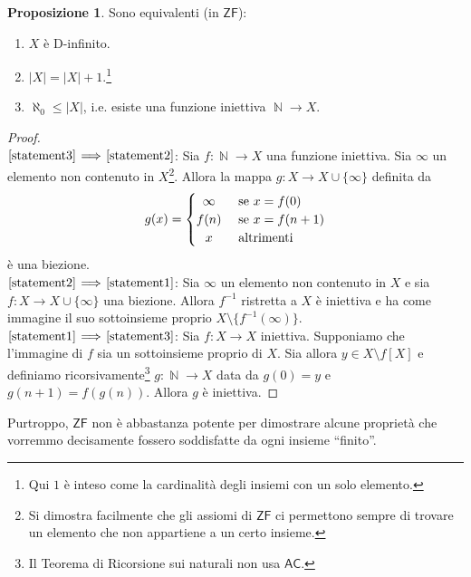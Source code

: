 \documentclass[12pt,a4paper]{report}
\theoremstyle{definition}
\newtheorem{prop}[teo]{Proposizione}  %
\theoremstyle{num.custom-title}
\DeclareMathOperator{\N}{\mathbb{N}}
\DeclareMathOperator{\sm}{\setminus}
\newcommand{\AC}{\ensuremath{\mathsf{AC}}\xspace}
\newcommand{\ZF}{\ensuremath{\mathsf{ZF}}\xspace}
\newcommand{\Implies}[2]{$\text{\ref{statement#1}}\!\implies\!\text{\ref{statement#2}}$}%
\newcommand{\punto}[1]{\item \label{statement#1}}
\newenvironment{equivalence}
    {\begin{enumerate}[label=(\arabic*),ref=(\arabic*)]
    }
    { 
	\end{enumerate}
    }
\begin{document}
\begin{prop}\label{caratt_d-fin} Sono equivalenti (in \ZF):
\begin{equivalence}
\punto{1} $X$ è D-infinito.
\punto{2} $|X|=|X|+1$.\footnote{Qui $1$ è inteso come la cardinalità degli insiemi con un solo elemento.}
\punto{3} $\aleph_0 \leq |X|$, i.e. esiste una funzione iniettiva $\N \to X$.
\end{equivalence}
\begin{proof}\ \\
\Implies{3}{2}: Sia $f: \N \to X$ una funzione iniettiva. Sia $\infty$ un elemento non contenuto in $X$\footnote{Si dimostra facilmente che gli assiomi di \ZF ci permettono sempre di trovare un elemento che non appartiene a un certo insieme.}. Allora la mappa $g: X \to X \cup \{\infty\}$ definita da 
\[
g(x)=
  \begin{cases} 
      \hfill		\infty	\hfill & \text{ se $x=f(0)$} \\
      \hfill 	f(n)		\hfill & \text{ se $x=f(n+1)$} \\
      \hfill 	x		\hfill & \text{ altrimenti} \\
  \end{cases}
\]
è una biezione.\\
\Implies{2}{1}: Sia $\infty$ un elemento non contenuto in $X$ e sia $f: X \to X \cup \{\infty\}$ una biezione. Allora $f^{-1}$ ristretta a $X$ è iniettiva e ha come immagine il suo sottoinsieme proprio $X \sm \{f^{-1}(\infty)\}$.\\
\Implies{1}{3}: Sia $f: X \to X$ iniettiva. Supponiamo che l'immagine di $f$ sia un sottoinsieme proprio di $X$. Sia allora $y \in X \sm f[X]$ e definiamo ricorsivamente\footnote{Il Teorema di Ricorsione sui naturali non usa \AC.} $g: \N \to X$ data da $g(0)=y$ e $g(n+1)=f(g(n))$. Allora $g$ è iniettiva.
\end{proof}
\end{prop}

Purtroppo, \ZF non è abbastanza potente per dimostrare alcune proprietà che vorremmo decisamente fossero soddisfatte da ogni insieme ``finito''.
\end{document}
